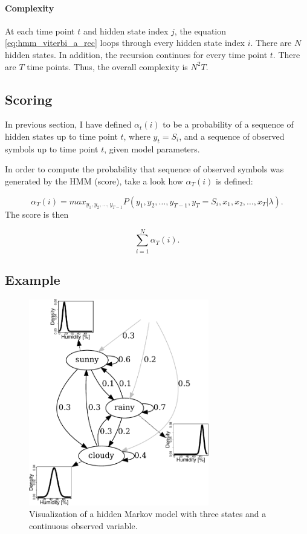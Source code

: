 \documentclass[thesis=B,english]{FITthesis}[2012/06/26]
\begin{document}
\paragraph{Complexity}

At each time point $t$ and hidden state index $j$, the equation \ref{eq:hmm_viterbi_a_rec} loops through every hidden state index $i$. There are $N$ hidden states. In addition, the recursion continues for every time point $t$. There are $T$ time points. Thus, the overall complexity is
$N^2 T$.

\subsection{Scoring}

In previous section, I have defined $\alpha_t(i)$ to be a probability of a sequence of hidden states up to time point $t$, where $y_t = S_i$, and a sequence of observed symbols up to time point $t$, given model parameters.

In order to compute the probability that sequence of observed symbols was generated by the HMM (score), take a look how $\alpha_T(i)$ is defined:

\begin{equation*}
\alpha_T(i) = max_{y_1,y_2,\dots,y_{T-1}} P(y_1,y_2,\dots,y_{T-1},y_T = S_i,x_1,x_2,\dots,x_T | \lambda).
\end{equation*}
The score is then

\begin{equation*}
\sum_{i=1}^{N} \alpha_T(i).
\end{equation*}

\subsection{Example}

\begin{figure}
	\centering
 	\includegraphics[width=0.7\textwidth]{hmm-graph}
 	\caption{Visualization of a hidden Markov model with three states and a continuous observed variable.}
 	\label{fig:hmm_graph}
\end{figure}
\end{document}
